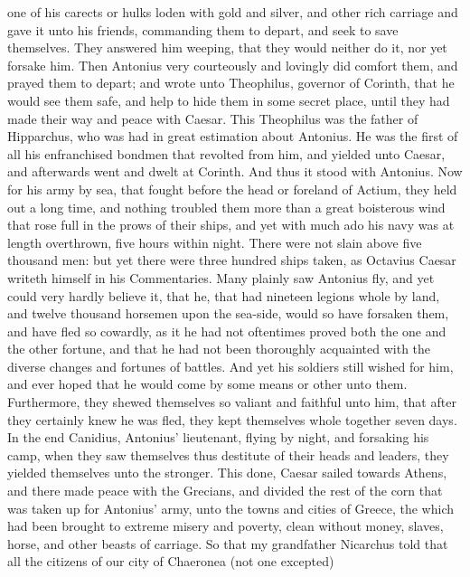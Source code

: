 \documentclass{book}
\begin{document}
one of his carects or hulks loden with gold and silver, and other rich
carriage and gave it unto his friends, commanding them to depart, and
seek to save themselves. They answered him weeping, that they would
neither do it, nor yet forsake him. Then Antonius very courteously
and lovingly did comfort them, and prayed them to depart; and wrote
unto Theophilus, governor of Corinth, that he would see them safe, and
help to hide them in some secret place, until they had made their way
and peace with Caesar. This Theophilus was the father of Hipparchus,
who was had in great estimation about Antonius. He was the first of
all his enfranchised bondmen that revolted from him, and yielded unto
Caesar, and afterwards went and dwelt at Corinth.
And thus it stood with Antonius. Now  for his army by sea, that fought before the head or
foreland of Actium, they held out a long time, and nothing troubled
them more than a great boisterous wind that rose full in the prows of
their ships, and yet with much ado his navy was at length overthrown,
five hours within night. There were not slain above five thousand
men: but yet there were three hundred ships taken, as Octavius Caesar
writeth himself in his Commentaries. Many plainly saw Antonius fly,
and yet could very hardly believe it, that he, that had nineteen
legions whole by land, and twelve thousand horsemen upon the sea-side,
would so have forsaken them, and have fled so cowardly, as it he
had not oftentimes proved both the one and the other fortune, and
that he had not been thoroughly acquainted with the diverse changes
and fortunes of battles. And yet his soldiers still wished for him,
and ever hoped that he would come by some means or other unto them.
Furthermore, they shewed themselves so valiant and faithful unto him,
that after they certainly knew he was fled, they kept themselves whole
together seven days.
In the end Canidius, Antonius' lieutenant, flying by night, 
and forsaking his camp, when they saw themselves thus destitute of their heads
and leaders, they yielded themselves unto the stronger. This done,
Caesar sailed towards Athens, and there made peace with the Grecians,
and divided the rest of the corn that was taken up for Antonius'
army, unto the towns and cities of Greece, the which had been brought
to extreme misery and poverty, clean without money, slaves, horse,
and other beasts of carriage. So that my grandfather Nicarchus told
that all the citizens of our city of Chaer\-o\-ne\-a (not one excepted)
\end{document}
